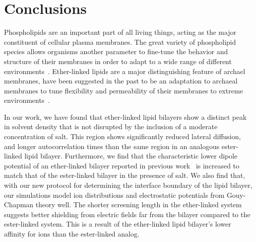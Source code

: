 \documentclass[12pt,openany,final]{book}
\begin{document}
\chapter{Conclusions}
Phospholipids are an important part of all living things, acting as the major constituent of cellular plasma membranes. 
The great variety of phospholipid species allows organisms another parameter
to fine-tune the behavior and structure of their membranes in order to adapt to a wide range of different
environments~\cite{van:2008:lipidvariety}.
Ether-linked lipids are a major distinguishing feature of archael membranes, have been suggested in the past to be an adaptation to archaeal membranes to tune
flexibility and permeability of their membranes to extreme environments~\cite{koga:2014,valentine:2007}.

In our work, we have found that ether-linked lipid bilayers show a distinct peak in solvent density
that is not disrupted by the inclusion of a moderate concentration of salt. This region
shows significantly reduced lateral diffusion, and longer autocorrelation times than the same
region in an analogous ester-linked lipid bilayer. Furthermore, we find that
the characteristic lower dipole potential of an ether-linked bilayer reported in previous work~\cite{kruczek:2017:ether} is 
increased to match that of the ester-linked bilayer in the presence of salt. We also find that,
with our new protocol for determining the interface boundary of the lipid bilayer,
our simulations model ion distributions and electrostatic potentials from Gouy-Chapman theory well. 
The shorter screening length in the
ether-linked system suggests better shielding from electric fields far 
from the bilayer compared to the ester-linked system. This is a result
of the ether-linked lipid bilayer's lower affinity for ions than the ester-linked analog.

\end{document}
